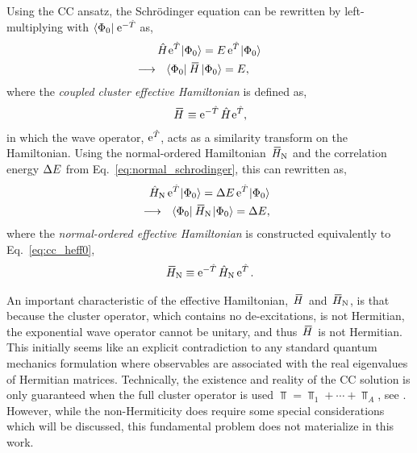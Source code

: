 \documentclass[thesis.tex]{subfiles}
\begin{document}
Using the CC ansatz, the Schr\"odinger equation can be rewritten by left-multiplying with $\langle \Phi_{0} |\hspace{1pt} \operatorname{e}^{-\hat{T}\hspace{-0.25pt}}$ as,
\begin{gather} \label{eq:cc_schrodeq}
  \Ham \E^{\Top} \refket = E \E^{\Top} \refket \notag \\
  \hspace{-1.0cm}\longrightarrow \ \ \refbra\EHam\refket = E,
\end{gather}
where the \textit{coupled cluster effective Hamiltonian} is defined as,
\begin{align} \label{eq:cc_heff0}
  \EHam \equiv \E^{-\Top} \Ham \E^{\Top},
\end{align}
in which the wave operator, $\operatorname{e}^{\hat{T}\hspace{-0.25pt}}$, acts as a similarity transform on the Hamiltonian.  Using the normal-ordered Hamiltonian $\EHamN$ and the correlation energy $\Delta E$ from Eq.\ \eqref{eq:normal_schrodinger}, this can rewritten as,
\begin{align} \label{eq:cc_heff1}
  \HamN \E^{\Top} \refket = \Ecorr \E^{\Top} \refket \notag \\
  \hspace{-1.0cm}\longrightarrow \ \ \refbra\EHamN\refket = \Ecorr,
\end{align}
where the \textit{normal-ordered effective Hamiltonian} is constructed equivalently to Eq.\ \eqref{eq:cc_heff0},
\begin{align} \label{eq:cc_heff0}
  \EHamN \equiv \E^{-\Top} \HamN \E^{\Top}.
\end{align}

An important characteristic of the effective Hamiltonian, $\EHam$ and $\EHamN$, is that because the cluster operator, which contains no de-excitations, is not Hermitian, the exponential wave operator cannot be unitary, and thus $\EHam$ is not Hermitian.  This initially seems like an explicit contradiction to any standard quantum mechanics formulation where observables are associated with the real eigenvalues of Hermitian matrices. Technically, the existence and reality of the CC solution is only guaranteed when the full cluster operator is used $\Top = \Top_{1} + \cdots + \Top_{A}$, see \cite{ZIVKOVIC1977,PIECUCH1990,PIECUCH2000,MOISEYEV2011}.  However, while the non-Hermiticity does require some special considerations which will be discussed, this fundamental problem does not materialize in this work.
\end{document}
